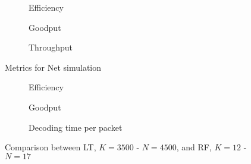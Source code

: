 \begin{figure}[t]
\centering
\begin{subfigure}{0.23\textwidth}
	\captionsetup{justification=centering,font=scriptsize}
	\centering
	\setlength\fwidth{\textwidth}
	\setlength{}
	
	\caption{Efficiency}
	\label{fig:net_eff}
\end{subfigure}\hspace{2em}%
\begin{subfigure}{0.23\textwidth}
	\captionsetup{justification=centering,font=scriptsize}
	\centering
	\setlength\fwidth{\textwidth}
	\setlength{}
	
	\caption{Goodput}
	\label{fig:net_good}
\end{subfigure}\hspace{2em}%
\begin{subfigure}{0.23\textwidth}
	\captionsetup{justification=centering,font=scriptsize}
	\centering
	\setlength\fwidth{\textwidth}
	\setlength{}
	
	\caption{Throughput}
	\label{fig:net_thr}
\end{subfigure}
\caption{Metrics for Net simulation}
\label{fig:net}
\end{figure}

\begin{figure}[t]
\centering
\begin{subfigure}{0.23\textwidth}
	\captionsetup{justification=centering,font=scriptsize}
	\centering
	\setlength\fwidth{\textwidth}
	\setlength{}
	
	\caption{Efficiency}
	\label{fig:RF_eff}
\end{subfigure}\hspace{2em}%
\begin{subfigure}{0.23\textwidth}
	\captionsetup{justification=centering,font=scriptsize}
	\centering
	\setlength\fwidth{\textwidth}
	\setlength{}
	
	\caption{Goodput}
	\label{fig:RF_good}
\end{subfigure}\hspace{2em}%
\begin{subfigure}{0.23\textwidth}
	\captionsetup{justification=centering,font=scriptsize}
	\centering
	\setlength\fwidth{\textwidth}
	\setlength{}
	\caption{Decoding time per packet}
	\label{fig:RFLT_dectime}
\end{subfigure}
\caption{Comparison between LT, $K=3500$ - $N=4500$, and RF, $K=12$ - $N=17$}
\label{fig:RFLT}
\end{figure}